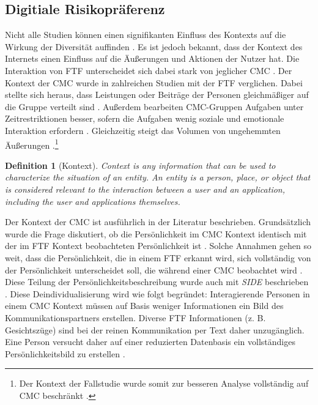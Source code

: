 \documentclass[12pt,a4paper,oneside]{article}
\newtheorem{defi}{Definition}
\begin{document}
\begin{titlepage}
\begin{flushleft}
\subsection{Digitiale Risikopräferenz}
Nicht alle Studien können einen signifikanten Einfluss des Kontexts auf die Wirkung der Diversität auffinden \cite[S. 693]{jackson2004diversity}. Es ist jedoch bekannt, dass der Kontext des Internets einen Einfluss auf die Äu\-ße\-rungen und Aktionen der Nutzer hat. Die Interaktion von \ac{FTF} unterscheidet sich dabei stark von jeglicher \ac{CMC} \cite{kiesler1984social,siegel1986group,lea1992paralanguage,walther1996computer}. Der Kontext der CMC wurde in zahlreichen Studien mit der FTF verglichen. Dabei stellte sich heraus, dass Leistungen oder Beiträge der Personen gleichmäßiger auf die Gruppe verteilt sind \cite{siegel1986group,mcguire1987group}. Außerdem bearbeiten CMC-Gruppen Aufgaben unter Zeitrestriktionen besser, sofern die Aufgaben wenig soziale und emotionale Interaktion erfordern \cite{gallupe1991unblocking,straus1994does}. Gleichzeitig steigt das Volumen von ungehemmten Äußerungen \cite{kiesler1984social,siegel1986group}.\footnote{Der Kontext der Fallstudie wurde somit zur besseren Analyse vollständig auf \ac{CMC} beschränkt \cite{dey2001understanding}.}

\begin{defi}[Kontext]
Context is any information that can be used to characterize the 
situation of an entity. An entity is a person, place, or object that is 
considered relevant to the interaction between a user and an 
application, including the user and applications themselves. \cite[S. 5]{dey2001understanding}
\end{defi}


Der Kontext der CMC ist ausführlich in der Literatur beschrieben. Grund\-sätzlich wurde die Frage diskutiert, ob die Persönlichkeit  im \ac{CMC} Kontext identisch mit der im \ac{FTF} Kontext beobachteten Persönlichkeit ist \cite{walther1996computer}. Solche Annahmen gehen so weit, dass die Persönlichkeit, die in einem \ac{FTF} erkannt wird, sich vollständig von der Persönlichkeit unterscheidet soll, die während einer \ac{CMC} beobachtet wird \cite{lea1992paralanguage}. Diese Teilung der Persönlichkeits\-beschreibung wurde auch mit \textit{\ac{SIDE}} beschrieben \cite{lea1992flaming}. Diese Deindividualisierung wird wie folgt begründet: Interagierende Personen in einem \ac{CMC} Kontext müssen auf Basis weniger Informationen ein Bild des Kommunikationspartners erstellen. Diverse \ac{FTF} Informationen (z. B. Gesichtszüge) sind bei der reinen Kommunikation per Text daher unzugänglich. Eine Person versucht daher auf einer reduzierten Datenbasis ein vollständiges Persönlichkeitsbild zu erstellen \cite{joinson2001self}.


\end{flushleft}
\end{titlepage}
\end{document}
